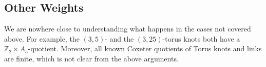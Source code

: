 \documentclass{article}
\newtheorem{theorem}{Theorem}[section]
\theoremstyle{definition}
\begin{document}
\subsection{Other Weights}
We are nowhere close to understanding what happens in the cases not covered above. For example, the $(3, 5)$- and the $(3, 25)$-torus knots both have a $\mathbb{Z}_2 \times A_5$-quotient. Moreover, all known Coxeter quotients of Torus knots and links are finite, which is not clear from the above arguments.

\newpage
%
%
%
%
%
%
%
%
%
%
%
\end{document}
